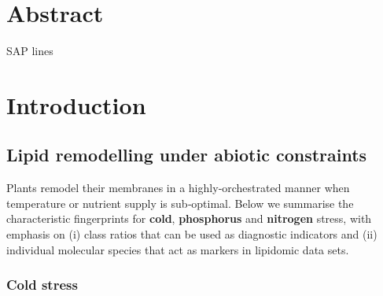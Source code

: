 \documentclass[10pt,letterpaper]{article}
\begin{document}
\section*{Abstract}
SAP lines



\linenumbers

\section*{Introduction}

\subsection*{Lipid remodelling under abiotic constraints}

Plants remodel their membranes in a highly‐orchestrated manner when temperature or nutrient supply is sub‑optimal.  Below we summarise the characteristic fingerprints for \textbf{cold}, \textbf{phosphorus} and \textbf{nitrogen} stress, with emphasis on (i) class ratios that can be used as diagnostic indicators and (ii) individual molecular species that act as markers in lipidomic data sets.

\subsubsection*{Cold stress}
\label{sec:cold}
\end{document}
